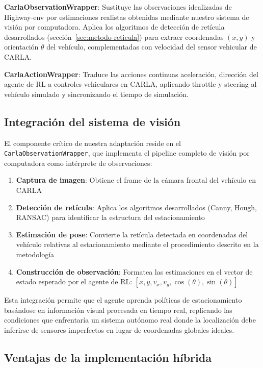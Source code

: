 \textbf{CarlaObservationWrapper}: Sustituye las observaciones idealizadas de Highway-env por estimaciones
realistas obtenidas mediante nuestro sistema de visión por computadora. Aplica los algoritmos de detección
de retícula desarrollados (sección~\ref{sec:metodo-reticula}) para extraer coordenadas $(x,y)$ y orientación
$\theta$ del vehículo, complementadas con velocidad del sensor vehicular de CARLA.


\textbf{CarlaActionWrapper}: Traduce las acciones continuas 
aceleración, dirección del agente de RL
a controles vehiculares en CARLA, aplicando throttle y steering al vehículo simulado 
y sincronizando
el tiempo de simulación.

\subsection{Integración del sistema de visión}

El componente crítico de nuestra adaptación reside en el \texttt{CarlaObservationWrapper}, que implementa
el pipeline completo de visión por computadora como intérprete de observaciones:

\begin{enumerate}
    \item \textbf{Captura de imagen}: Obtiene el frame de la cámara frontal del vehículo en CARLA
    \item \textbf{Detección de retícula}: Aplica los algoritmos desarrollados (Canny, Hough, RANSAC)
    para identificar la estructura del estacionamiento
    \item \textbf{Estimación de pose}: Convierte la retícula detectada en coordenadas del vehículo
    relativas al estacionamiento mediante el procedimiento descrito en la metodología
    \item \textbf{Construcción de observación}: Formatea las estimaciones en el vector de estado
    esperado por el agente de RL: $[x, y, v_x, v_y, \cos(\theta), \sin(\theta)]$
\end{enumerate}


Esta integración permite que el agente aprenda políticas de estacionamiento basándose en información
visual procesada en tiempo real, replicando las condiciones que enfrentaría un sistema autónomo real
donde la localización debe inferirse de sensores imperfectos en lugar de coordenadas globales ideales.

\subsection{Ventajas de la implementación híbrida}

